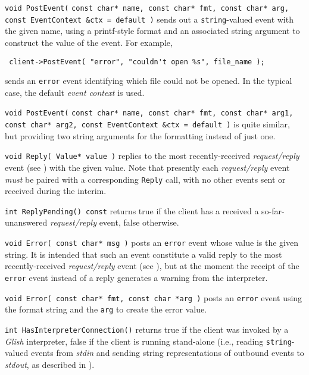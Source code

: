 \begin{sloppy}
\begin{list}{}{}
\item[{\tt void PostEvent(}] {\tt const char* name, const char* fmt, const char* arg, const EventContext \&ctx = default )} sends
out a {\tt string}-valued event with the given name,
using a printf-style format and an associated string argument to construct
the value of the event.  For example,
\begin{verbatim}
 client->PostEvent( "error", "couldn't open %s", file_name );
\end{verbatim}
sends an {\tt error} event identifying which file could not be opened. In the
typical case, the default {\em event context} is used.

\item[{\tt void PostEvent(}] {\tt const char* name, const char* fmt, const char* arg1, const char* arg2, const EventContext \&ctx = default )} is 
quite similar, but providing two string arguments for the formatting
instead of just one.

\item[{\tt void Reply( Value* value )}] replies
to the most recently-received {\em request/reply} event (see
) with the given value.  Note that presently each
{\em request/reply} event {\em must} be paired with a corresponding
{\tt Reply} call, with no other events sent or received during the interim.

\item[{\tt int ReplyPending() const}] returns true if the client
has a received a so-far-unanswered {\em request/reply} event, false otherwise.

\item[{\tt void Error( const char* msg )}] posts an
{\tt error} event whose value is the given string.  It is intended that
such an event constitute a valid reply to
the most recently-received {\em request/reply} event (see
), but at the moment the receipt of the {\tt error}
event instead of a reply generates a warning from the interpreter.

\item[{\tt void Error( const char* fmt, const char *arg )}] posts an
{\tt error} event using the format string and the {\tt arg} to create
the error value.

\item[{\tt int HasInterpreterConnection()}] returns
true if the client was
invoked by a {\em Glish} interpreter, false if the client is running stand-alone
(i.e., reading {\tt string}-valued events from {\em stdin} and sending
string representations of outbound events to {\em stdout\/}, as described
in ).


\end{list}
\end{sloppy}
